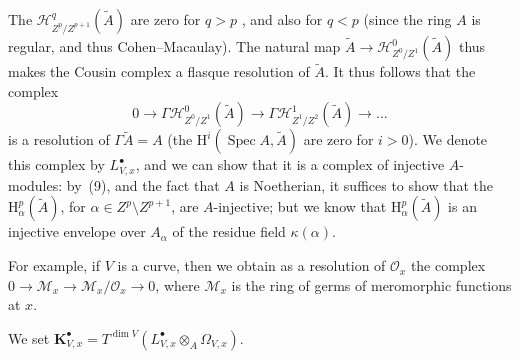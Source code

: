 \documentclass[british]{article}
\newcommand{\oldpage}[1]{\marginpar{\footnotesize$\Big\vert$ \textit{p.~#1}}}
\begin{document}
The \({\mathscr{H}}_{Z^p/Z^{p+1}}^q(\widetilde{A})\) are zero for
\(q>p\) \autocite[Lemma~2.4, p.~235]{7}, and also for \(q<p\) (since the
ring \(A\) is regular, and thus Cohen--Macaulay). \oldpage{85} The
natural map \(\widetilde{A}\to{\mathscr{H}}_{Z^0/Z^1}^0(\widetilde{A})\)
thus makes \autocite[Chapter~4, (2.6)]{7} the Cousin complex a flasque
resolution of \(\widetilde{A}\). It thus follows that the complex \[
  0
  \to \Gamma{\mathscr{H}}_{Z^0/Z^1}^0(\widetilde{A})
  \to \Gamma{\mathscr{H}}_{Z^1/Z^2}^1(\widetilde{A})
  \to \ldots
\] is a resolution of \(\Gamma\widetilde{A}=A\) (the
\(\mathrm{H}^i(\operatorname{Spec}{A},\widetilde{A})\) are zero for
\(i>0\)). We denote this complex by \(L_{V,x}^\bullet\), and we can show
that it is a complex of injective \(A\)-modules: by~(9), and the fact
that \(A\) is Noetherian, it suffices to show that the
\(\mathrm{H}_\alpha^p(\widetilde{A})\), for
\(\alpha\in Z^p\setminus Z^{p+1}\), are \(A\)-injective; but we know
\autocite[(4.13)]{8} that \(\mathrm{H}_\alpha^p(\widetilde{A})\) is an
injective envelope over \(A_\alpha\) of the residue field
\(\kappa(\alpha)\).

For example, if \(V\) is a curve, then we obtain as a resolution of
\({\mathscr{O}}_x\) the complex
\(0\to{\mathscr{M}}_x\to{\mathscr{M}}_x/{\mathscr{O}}_x\to0\), where
\({\mathscr{M}}_x\) is the ring of germs of meromorphic functions at
\(x\).

We set
\(\mathbf{K}_{V,x}^\bullet=T^{\dim V}(L_{V,x}^\bullet\otimes_A\Omega_{V,x})\).
\end{document}

